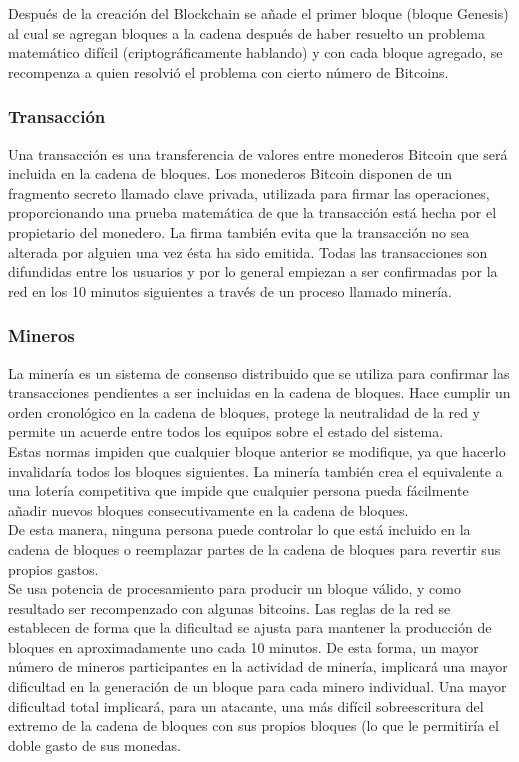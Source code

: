 \documentclass[12pt,letterpaper]{article}
\begin{document}
    Despu\'es de la creaci\'on del Blockchain se a\~nade el primer bloque (bloque Genesis) al cual se agregan bloques a la cadena despu\'es de haber resuelto un problema matem\'atico dif\'icil (criptogr\'aficamente hablando) y con cada bloque agregado, se recompenza a quien resolvi\'o el problema con cierto n\'umero de Bitcoins.

    \subsubsection*{Transacci\'on}

Una transacci\'on es una transferencia de valores entre monederos Bitcoin que ser\'a incluida en la cadena de bloques. Los monederos Bitcoin disponen de un fragmento secreto llamado clave privada, utilizada para firmar las operaciones, proporcionando una prueba matem\'atica de que la transacci\'on est\'a hecha por el propietario del monedero. La firma tambi\'en evita que la transacci\'on no sea alterada por alguien una vez \'esta ha sido emitida. Todas las transacciones son difundidas entre los usuarios y por lo general empiezan a ser confirmadas por la red en los 10 minutos siguientes a trav\'es de un proceso llamado miner\'ia.

		\subsubsection*{Mineros}
		La miner\'ia es un sistema de consenso distribuido que se utiliza para confirmar las transacciones pendientes a ser incluidas en la cadena de bloques. Hace cumplir un orden cronol\'ogico en la cadena de bloques, protege la neutralidad de la red y permite un acuerde entre todos los equipos sobre el estado del sistema. 
        \\
		Estas normas impiden que cualquier bloque anterior se modifique, ya que hacerlo invalidar\'ia todos los bloques siguientes. La miner\'ia tambi\'en crea el equivalente a una loter\'ia competitiva que impide que cualquier persona pueda f\'acilmente añadir nuevos bloques consecutivamente en la cadena de bloques. 
        \\
		De esta manera, ninguna persona puede controlar lo que est\'a incluido en la cadena de bloques o reemplazar partes de la cadena de bloques para revertir sus propios gastos.
        \\
		
Se usa potencia de procesamiento para producir un bloque v\'alido, y como resultado ser recompenzado con algunas bitcoins. Las reglas de la red se establecen de forma que la dificultad se ajusta para mantener la producci\'on de bloques en aproximadamente uno cada 10 minutos. De esta forma, un mayor n\'umero de mineros participantes en la actividad de miner\'ia, implicar\'a una mayor dificultad en la generaci\'on de un bloque para cada minero individual. Una mayor dificultad total implicar\'a, para un atacante, una m\'as dif\'icil sobreescritura del extremo de la cadena de bloques con sus propios bloques (lo que le permitir\'ia el doble gasto de sus monedas.
\\
\end{document}
